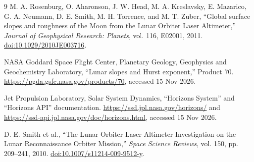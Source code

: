 \documentclass[10pt,a4paper]{article}
\begin{document}
\begin{thebibliography}{9}
\small
{}
M. A. Rosenburg, O. Aharonson, J. W. Head, M. A. Kreslavsky, E. Mazarico, G. A. Neumann, D. E. Smith, M. H. Torrence, and M. T. Zuber, ``Global surface slopes and roughness of the Moon from the Lunar Orbiter Laser Altimeter,'' \emph{Journal of Geophysical Research: Planets}, vol. 116, E02001, 2011. \href{https://doi.org/10.1029/2010JE003716}{doi:10.1029/2010JE003716}.

NASA Goddard Space Flight Center, Planetary Geology, Geophysics and Geochemistry Laboratory, ``Lunar slopes and Hurst exponent,'' Product 70. \url{https://pgda.gsfc.nasa.gov/products/70}, accessed 15 Nov 2026.

Jet Propulsion Laboratory, Solar System Dynamics, ``Horizons System'' and ``Horizons API'' documentation. \url{https://ssd.jpl.nasa.gov/horizons/} and \url{https://ssd-api.jpl.nasa.gov/doc/horizons.html}, accessed 15 Nov 2026.

D. E. Smith et al., ``The Lunar Orbiter Laser Altimeter Investigation on the Lunar Reconnaissance Orbiter Mission,'' \emph{Space Science Reviews}, vol. 150, pp. 209--241, 2010. \href{https://doi.org/10.1007/s11214-009-9512-y}{doi:10.1007/s11214-009-9512-y}.
\end{thebibliography}
\end{document}
